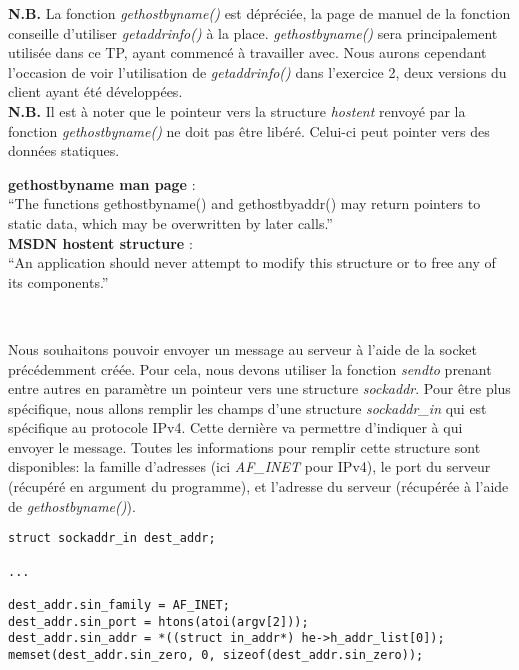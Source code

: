 \documentclass[a4paper, frenchb, 11pt]{article}
\begin{document}
\noindent \textbf{N.B.} La fonction \emph{gethostbyname()} est dépréciée, la page de manuel de la fonction conseille d'utiliser \emph{getaddrinfo()} à la place. \emph{gethostbyname()} sera principalement utilisée dans ce TP, ayant commencé à travailler avec. Nous aurons cependant l'occasion de voir l'utilisation de \emph{getaddrinfo()} dans l'exercice 2, deux versions du client ayant été développées.\\

\noindent \textbf{N.B.} Il est à noter que le pointeur vers la structure \emph{hostent} renvoyé par la fonction \emph{gethostbyname()} ne doit pas être libéré. Celui-ci peut pointer vers des données statiques.

\begin{mdframed}[backgroundcolor=hintbg, linecolor=hintborder]
	\textbf{gethostbyname man page} :\\ %
	``The functions gethostbyname() and gethostbyaddr() may  return  pointers to  static  data, which may be overwritten by later calls.''\\

	\noindent\textbf{MSDN hostent structure} :\\ %
	``An application should never attempt to modify this structure or to free any of its components.''
\end{mdframed}
\

Nous souhaitons pouvoir envoyer un message au serveur à l'aide de la socket précédemment créée. Pour cela, nous devons utiliser la fonction \emph{sendto} prenant entre autres en paramètre un pointeur vers une structure \emph{sockaddr}. Pour être plus spécifique, nous allons remplir les champs d'une structure \emph{sockaddr\_in} qui est spécifique au protocole IPv4. Cette dernière va permettre d'indiquer à qui envoyer le message. Toutes les informations pour remplir cette structure sont disponibles: la famille d'adresses (ici \emph{AF\_INET} pour IPv4), le port du serveur (récupéré en argument du programme), et l'adresse du serveur (récupérée à l'aide de \emph{gethostbyname()}).

\begin{lstlisting}
struct sockaddr_in dest_addr;

...

dest_addr.sin_family = AF_INET;
dest_addr.sin_port = htons(atoi(argv[2]));
dest_addr.sin_addr = *((struct in_addr*) he->h_addr_list[0]);
memset(dest_addr.sin_zero, 0, sizeof(dest_addr.sin_zero));
\end{lstlisting}
\
\end{document}
